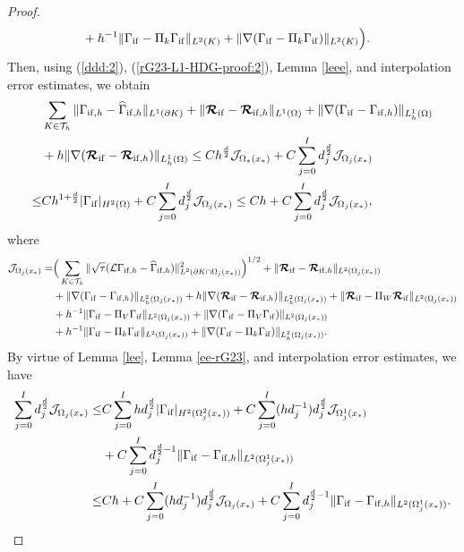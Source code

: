 \documentclass[1996/10/24]{amsart}
\theoremstyle{definition}
\numberwithin{equation}{section}
\begin{document}
\begin{proof}
\begin{align}
&+h^{-1}\|\Gamma_{{\rm if}}-\Pi_k\Gamma_{{\rm if}}\|_{L^2(K)}+\|\nabla(\Gamma_{{\rm if}}-\Pi_k\Gamma_{{\rm if}})\|_{L^2(K)}\Big).\nonumber
\end{align}
Then, using (\ref{ddd:2}), (\ref{rG23-L1-HDG-proof:2}), Lemma \ref{leee}, and interpolation error estimates, we obtain
\begin{align}
&\sum_{K\in\mathcal{T}_h}\|\Gamma_{{\rm if},h}-\widehat{\Gamma}_{{\rm if},h}\|_{L^1(\partial K)}+\|\boldsymbol{\mathcal{R}}_{{\rm if}}-\boldsymbol{\mathcal{R}}_{{\rm if},h}\|_{L^1(\Omega)}+\|\nabla(\Gamma_{{\rm if}}-\Gamma_{{\rm if},h})\|_{L_h^1(\Omega)}\nonumber\\
&+h\|\nabla(\boldsymbol{\mathcal{R}}_{{\rm if}}-\boldsymbol{\mathcal{R}}_{{\rm if},h})\|_{L_h^1(\Omega)}
\leq Ch^{\frac{d}{2}}\mathcal{J}_{\Omega_{\ast}(x_{\ast})}+C\sum_{j=0}^I d_j^{\frac{d}{2}}\mathcal{J}_{\Omega_j(x_{\ast})}\label{rG23-L1-HDG-proof:3}\\
\leq& Ch^{1+\frac{d}{2}}|\Gamma_{{\rm if}}|_{H^2(\Omega)}+C\sum_{j=0}^I d_j^{\frac{d}{2}}\mathcal{J}_{\Omega_j(x_{\ast})}\leq Ch+C\sum_{j=0}^I d_j^{\frac{d}{2}}\mathcal{J}_{\Omega_j(x_{\ast})},\nonumber
\end{align}
where
\begin{align*}
\mathcal{J}_{\Omega_j(x_{\ast})}=&\Big(\sum_{K\in\mathcal{T}_h}\|\sqrt{\tau}(\mathcal{L}\Gamma_{{\rm if},h}-\widehat{\Gamma}_{{\rm if},h})\|_{L^2(\partial K\cap\Omega_j(x_{\ast}))}^2\Big)^{1/2}+\|\boldsymbol{\mathcal{R}}_{{\rm if}}-\boldsymbol{\mathcal{R}}_{{\rm if},h}\|_{L^2(\Omega_j(x_{\ast}))}\\
&+\|\nabla(\Gamma_{{\rm if}}-\Gamma_{{\rm if},h})\|_{L_h^2(\Omega_j(x_{\ast}))}+h\|\nabla(\boldsymbol{\mathcal{R}}_{{\rm if}}-\boldsymbol{\mathcal{R}}_{{\rm if},h})\|_{L_h^2(\Omega_j(x_{\ast}))}+\|\boldsymbol{\mathcal{R}}_{{\rm if}}-\Pi_W\boldsymbol{\mathcal{R}}_{{\rm if}}\|_{L^2(\Omega_j(x_{\ast}))}\\
&+h^{-1}\|\Gamma_{{\rm if}}-\Pi_V\Gamma_{{\rm if}}\|_{L^2(\Omega_j(x_{\ast}))}+\|\nabla(\Gamma_{{\rm if}}-\Pi_V\Gamma_{{\rm if}})\|_{L^2(\Omega_j(x_{\ast}))}\\
&+h^{-1}\|\Gamma_{{\rm if}}-\Pi_k\Gamma_{{\rm if}}\|_{L^2(\Omega_j(x_{\ast}))}+\|\nabla(\Gamma_{{\rm if}}-\Pi_k\Gamma_{{\rm if}})\|_{L_h^2(\Omega_j(x_{\ast}))}.
\end{align*}
By virtue of Lemma \ref{lee}, Lemma \ref{ee-rG23}, and interpolation error estimates, we have
\begin{align}
\sum_{j=0}^Id_j^{\frac{d}{2}}\mathcal{J}_{\Omega_j(x_{\ast})}\leq& C\sum_{j=0}^Ihd_j^{\frac{d}{2}}|\Gamma_{{\rm if}}|_{H^2(\Omega_j^2(x_{\ast}))}
+C\sum_{j=0}^I(hd_j^{-1})d_j^{\frac{d}{2}}\mathcal{J}_{\Omega_j^1(x_{\ast})}\nonumber\\
&+C\sum_{j=0}^Id_j^{\frac{d}{2}-1}\|\Gamma_{{\rm if}}-\Gamma_{{\rm if},h}\|_{L^2(\Omega_j^1(x_{\ast}))}\label{rG23-L1-HDG-proof:4}\\
\leq& Ch+C\sum_{j=0}^I(hd_j^{-1})d_j^{\frac{d}{2}}\mathcal{J}_{\Omega_j(x_{\ast})}+C\sum_{j=0}^Id_j^{\frac{d}{2}-1}\|\Gamma_{{\rm if}}-\Gamma_{{\rm if},h}\|_{L^2(\Omega_j^1(x_{\ast}))}.\nonumber
\end{align}


\end{proof}
\end{document}
